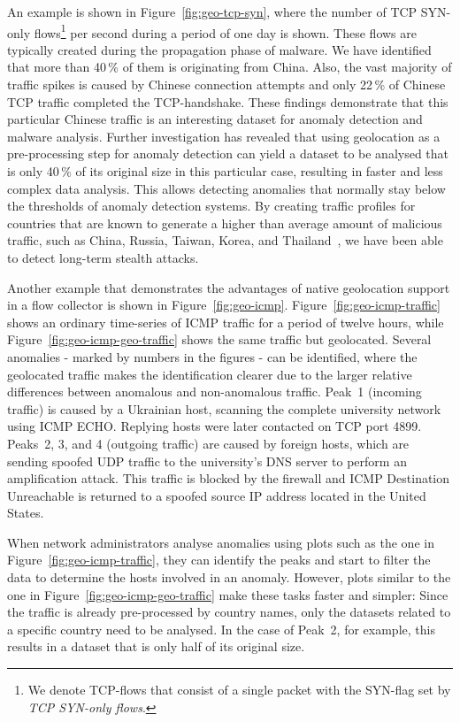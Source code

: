 An example is shown in Figure~\ref{fig:geo-tcp-syn}, where the number of TCP SYN-only flows\footnote{We denote TCP-flows that consist of a single packet with the SYN-flag set by \textit{TCP SYN-only flows}.} per second during a period of one day is shown. These flows are typically created during the propagation phase of malware. We have identified that more than 40\,\% of them is originating from China. Also, the vast majority of traffic spikes is caused by Chinese connection attempts and only 22\,\% of Chinese TCP traffic completed the TCP-handshake. These findings demonstrate that this particular Chinese traffic is an interesting dataset for anomaly detection and malware analysis. Further investigation has revealed that using geolocation as a pre-processing step for anomaly detection can yield a dataset to be analysed that is only 40\,\% of its original size in this particular case, resulting in faster and less complex data analysis. This allows detecting anomalies that normally stay below the thresholds of anomaly detection systems. By creating traffic profiles for countries that are known to generate a higher than average amount of malicious traffic, such as China, Russia, Taiwan, Korea, and Thailand~\cite{vanPolen-2011-Finding}, we have been able to detect long-term stealth attacks.

Another example that demonstrates the advantages of native geolocation support in a flow collector is shown in Figure~\ref{fig:geo-icmp}. Figure~\ref{fig:geo-icmp-traffic} shows an ordinary time-series of ICMP traffic for a period of twelve hours, while Figure~\ref{fig:geo-icmp-geo-traffic} shows the same traffic but geolocated. Several anomalies - marked by numbers in the figures - can be identified, where the geolocated traffic makes the identification clearer due to the larger relative differences between anomalous and non-anomalous traffic. Peak~1 (incoming traffic) is caused by a Ukrainian host, scanning the complete university network using ICMP ECHO. Replying hosts were later contacted on TCP port 4899. Peaks~2, 3, and 4 (outgoing traffic) are caused by foreign hosts, which are sending spoofed UDP traffic to the university's DNS server to perform an amplification attack. This traffic is blocked by the firewall and ICMP Destination Unreachable is returned to a spoofed source IP address located in the United States.

When network administrators analyse anomalies using plots such as the one in Figure~\ref{fig:geo-icmp-traffic}, they can identify the peaks and start to filter the data to determine the hosts involved in an anomaly. However, plots similar to the one in Figure~\ref{fig:geo-icmp-geo-traffic} make these tasks faster and simpler: Since the traffic is already pre-processed by country names, only the datasets related to a specific country need to be analysed. In the case of Peak~2, for example, this results in a dataset that is only half of its original size.


